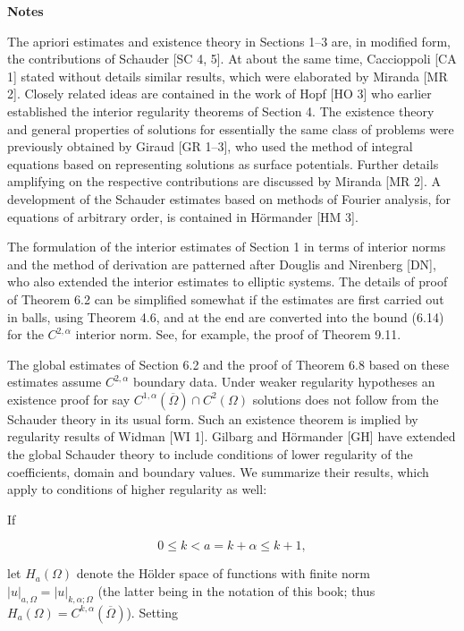 \bigskip

\noindent\textbf{Notes}

The apriori estimates and existence theory in Sections 1--3 are, in modified form, the contributions of Schauder [SC 4, 5]. At about the same time, Caccioppoli [CA 1] stated without details similar results, which were elaborated by Miranda [MR 2]. Closely related ideas are contained in the work of Hopf [HO 3] who earlier established the interior regularity theorems of Section 4. The existence theory and general properties of solutions for essentially the same class of problems were previously obtained by Giraud [GR 1--3], who used the method of integral equations based on representing solutions as surface potentials. Further details amplifying on the respective contributions are discussed by Miranda [MR 2]. A development of the Schauder estimates based on methods of Fourier analysis, for equations of arbitrary order, is contained in H\"ormander [HM 3].

The formulation of the interior estimates of Section 1 in terms of interior norms and the method of derivation are patterned after Douglis and Nirenberg [DN], who also extended the interior estimates to elliptic systems. The details of proof of Theorem 6.2 can be simplified somewhat if the estimates are first carried out in balls, using Theorem 4.6, and at the end are converted into the bound (6.14) for the $C^{2,\alpha}$ interior norm. See, for example, the proof of Theorem 9.11.

The global estimates of Section 6.2 and the proof of Theorem 6.8 based on these estimates assume $C^{2,\alpha}$ boundary data. Under weaker regularity hypotheses an existence proof for say $C^{1,\alpha}(\overline{\Omega}) \cap C^2(\Omega)$ solutions does not follow from the Schauder theory in its usual form. Such an existence theorem is implied by regularity results of Widman [WI 1]. Gilbarg and H\"ormander [GH] have extended the global Schauder theory to include conditions of lower regularity of the coefficients, domain and boundary values. We summarize their results, which apply to conditions of higher regularity as well:

\medskip

\noindent If

\[
0 \le k < a = k + \alpha \le k + 1,
\]

\noindent let $H_a(\Omega)$ denote the Hölder space of functions with finite norm $|u|_{a,\Omega} = |u|_{k,\alpha;\Omega}$ (the latter being in the notation of this book; thus $H_a(\Omega)=C^{k,\alpha}(\overline{\Omega})$). Setting

